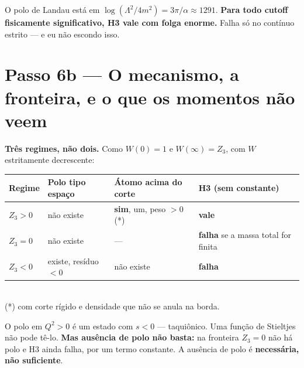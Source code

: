 \documentclass[11pt,a4paper]{article}
\begin{document}
O polo de Landau está em $\log(\Lambda^2/4m^2)=3\pi/\alpha\approx1291$.
\textbf{Para todo cutoff fisicamente significativo, H3 vale com folga enorme.}
Falha só no contínuo estrito --- e eu não escondo isso.

\section*{Passo 6b --- O mecanismo, a fronteira, e o que os momentos n\~ao veem}

\textbf{Tr\^es regimes, n\~ao dois.} Como $W(0)=1$ e $W(\infty)=Z_3$, com $W$
estritamente decrescente:

\begin{center}\small
\begin{tabular}{llll}
\toprule
Regime & Polo tipo espa\c{c}o & \'Atomo acima do corte & H3 (sem constante) \\
\midrule
$Z_3>0$ & n\~ao existe & \textbf{sim}, um, peso $>0$ (*) & \textbf{vale} \\
$Z_3=0$ & n\~ao existe & --- & \textbf{falha} se a massa total for finita \\
$Z_3<0$ & existe, res\'iduo $<0$ & n\~ao existe & \textbf{falha} \\
\bottomrule
\end{tabular}\\[1mm]
{\footnotesize (*) com corte r\'igido e densidade que n\~ao se anula na borda.}
\end{center}

O polo em $Q^2>0$ \'e um estado com $s<0$ --- taquiônico. Uma fun\c{c}\~ao de
Stieltjes n\~ao pode t\^e-lo. \textbf{Mas ausência de polo n\~ao basta:} na
fronteira $Z_3=0$ n\~ao h\'a polo e H3 ainda falha, por um termo constante.
A aus\^encia de polo \'e \textbf{necess\'aria, n\~ao suficiente}.
\end{document}

